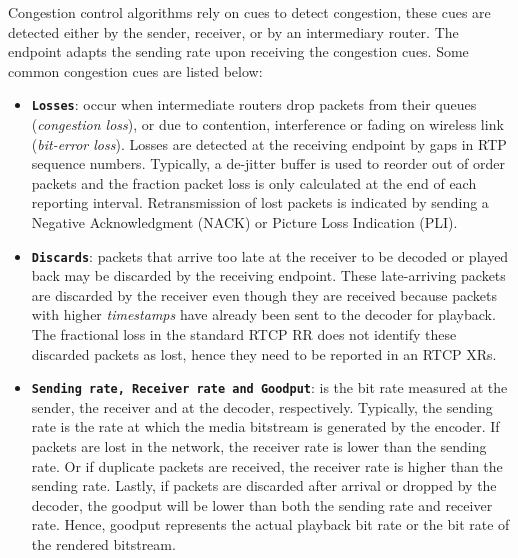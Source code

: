 Congestion control algorithms rely on cues to detect congestion, these cues
are detected either by the sender, receiver, or by an intermediary router. The
endpoint adapts the sending rate upon receiving the congestion cues. Some
common congestion cues are listed below:

\begin{itemize}
\setlength{\itemsep}{5pt}

\item \textbf{\texttt{Losses}}: occur when intermediate routers drop packets
from their queues (\emph{congestion loss}), or due to contention, interference
or fading on wireless link (\emph {bit-error loss}). Losses are detected at
the receiving endpoint by gaps in RTP sequence numbers. Typically, a de-jitter
buffer is used to reorder out of order packets and the fraction packet loss is
only calculated at the end of each reporting interval. Retransmission of lost
packets is indicated by sending a Negative Acknowledgment (NACK) or Picture
Loss Indication (PLI).

\item \textbf{\texttt{Discards}}: packets that arrive too late at the receiver
to be decoded or played back may be discarded by the receiving endpoint. These
late-arriving packets are discarded by the receiver even though they are
received because packets with higher \textit{timestamps} have already been
sent to the decoder for playback. The fractional loss in the standard RTCP RR
does not identify these discarded packets as lost, hence they need to be
reported in an RTCP XRs.

\item \textbf{\texttt{Sending rate, Receiver rate and Goodput}}: is the bit
rate measured at the sender, the receiver and at the decoder, respectively.
Typically, the sending rate is the rate at which the media bitstream is
generated by the encoder. If packets are lost in the network, the receiver
rate is lower than the sending rate. Or if duplicate packets are received, the
receiver rate is higher than the sending rate. Lastly, if packets are
discarded after arrival or dropped by the decoder, the goodput will be lower
than both the sending rate and receiver rate. Hence, goodput represents the
actual playback bit rate or the bit rate of the rendered bitstream.


\end{itemize}
